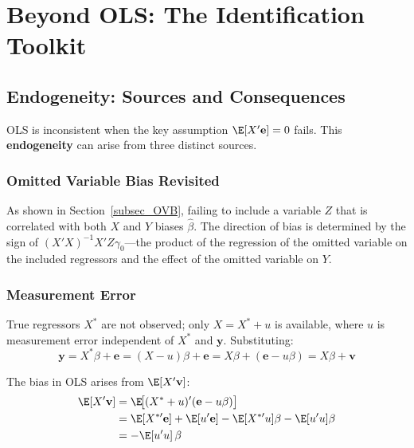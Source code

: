 
\chapter[Beyond OLS]{Beyond OLS: The Identification Toolkit}
\label{chap_BeyondOLS}

\section{Endogeneity: Sources and Consequences}
\label{sec_Endogeneity}

OLS is inconsistent when the key assumption $\E[X'\mathbf{e}] = 0$ fails.
This \textbf{endogeneity} can arise from three distinct
sources.

\subsection{Omitted Variable Bias Revisited}

As shown in Section~\ref{subsec_OVB}, failing to include a variable $Z$ that
is correlated with both $X$ and $Y$ biases $\hat\beta$. The direction of bias
is determined by the sign of $(X'X)^{-1}X'Z\gamma_0$---the product of the
regression of the omitted variable on the included regressors and the effect
of the omitted variable on $Y$.

\subsection{Measurement Error}

True regressors $X^*$ are not observed; only $X = X^* + u$ is available,
where $u$ is measurement error independent of $X^*$ and $\mathbf{y}$.
Substituting:
\begin{equation}
  \mathbf{y} = X^*\beta + \mathbf{e} = (X-u)\beta + \mathbf{e}
             = X\beta + (\mathbf{e} - u\beta) = X\beta + \mathbf{v}
\end{equation}

The bias in OLS arises from $\E[X'\mathbf{v}]$:
\begin{align}
  \E[X'\mathbf{v}]
  &= \E\!\bigl[(X^*+u)'(\mathbf{e}-u\beta)\bigr] \nonumber \\
  &= \E[X^{*\prime}\mathbf{e}] + \E[u'\mathbf{e}]
     - \E[X^{*\prime}u]\beta - \E[u'u]\beta \nonumber \\
  &= -\E[u'u]\,\beta
\end{align}

